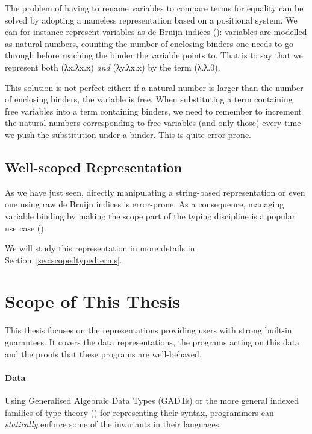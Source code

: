 The problem of having to rename variables to compare terms for
equality can be solved by adopting a nameless representation
based on a positional system.
%
We can for instance represent variables as de Bruijn indices
(\citeyear{de1972lambda}): variables are modelled as natural numbers,
counting the number of enclosing binders one needs to go through before
reaching the binder the variable points to. That is to say that we
represent both (λx.λx.x) \emph{and} (λy.λx.x) by the term (λ.λ.0).

This solution is not perfect either: if a natural number is larger
than the number of enclosing binders, the variable is free. When
substituting a term containing free variables into a term containing
binders, we need to remember to increment the natural numbers
corresponding to free variables (and only those) every time we push
the substitution under a binder. This is quite error prone.

\subsection{Well-scoped Representation}

As we have just seen, directly manipulating a string-based representation
or even one using raw de Bruijn indices is error-prone. As a consequence,
managing variable binding by making the scope part of the typing discipline
is a popular use case
(\cite{BELLEGARDE1994287,bird_paterson_1999,altenkirch1999monadic}).

We will study this representation in more details in
Section~\ref{sec:scopedtypedterms}.

\section{Scope of This Thesis}

This thesis focuses on the representations providing users with strong
built-in guarantees. It covers the data representations, the programs
acting on this data and the proofs that these programs are well-behaved.

\paragraph{Data}
Using Generalised Algebraic Data Types (GADTs) or the more general indexed
families of type theory (\cite{dybjer1994inductive}) for representing their
syntax, programmers can \emph{statically} enforce some of the invariants
in their languages.

